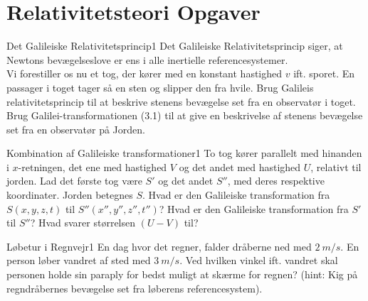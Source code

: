 

\chapter{Relativitetsteori Opgaver}

\begin{opgave}{Det Galileiske Relativitetsprincip}{1}
Det Galileiske Relativitetsprincip siger, at Newtons bevægelseslove er ens i alle inertielle referencesystemer.\\
Vi forestiller os nu et tog, der kører med en konstant hastighed $v$ ift. sporet. En passager i toget tager så en sten og slipper den fra hvile.  
\opg Brug Galileis relativitetsprincip til at beskrive stenens bevægelse set fra en observatør i toget.
\opg Brug Galilei-transformationen (3.1) til at give en beskrivelse af stenens bevægelse set fra en observatør på Jorden. 
\end{opgave}

\begin{opgave}{Kombination af Galileiske transformationer}{1}	
	To tog kører parallelt med hinanden i $x$-retningen, det ene med hastighed $V$ og det andet med hastighed $U$,
	relativt til jorden. Lad det første tog være $S'$ og det andet $S''$, med deres respektive koordinater. Jorden betegnes $S$.
	\opg Hvad er den Galileiske transformation fra $S \left( x,y,z,t \right)$ til $S'' \left( x'',y'',z'',t'' \right)$?
	\opg Hvad er den Galileiske transformation fra $S'$ til $S''$?
	\opg Hvad svarer størrelsen $\left( U- V \right)$ til?	 
\end{opgave}

\begin{opgave}{Løbetur i Regnvejr}{1}
En dag hvor det regner, falder dråberne ned med $\SI{2}{m/s}$. En person løber vandret af sted med $\SI{3}{m/s}$. Ved hvilken vinkel ift. vandret skal personen holde sin paraply for bedst muligt at skærme for regnen? (hint: Kig på regndråbernes bevægelse set fra løberens referencesystem).
\end{opgave}

